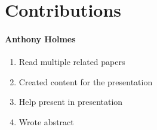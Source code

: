 \section{Contributions}

\paragraph{Anthony Holmes}
\begin{enumerate}
    \item Read multiple related papers
    \item Created content for the presentation
    \item Help present in presentation
    \item Wrote abstract
\end{enumerate}
